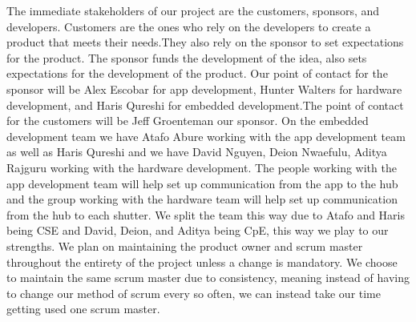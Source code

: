The immediate stakeholders of our project are the customers, sponsors, and developers. Customers are the ones who rely on the developers to create a product that meets their needs.They also rely on the sponsor to set expectations for the product. The sponsor funds the development of the idea, also sets expectations for the development of the product. Our point of contact for the sponsor will be Alex Escobar for app development, Hunter Walters for hardware development, and Haris Qureshi for embedded development.The point of contact for the customers will be Jeff Groenteman our sponsor. On the embedded development team we have Atafo Abure working with the app development team as well as Haris Qureshi and we have David Nguyen, Deion Nwaefulu, Aditya Rajguru working with the hardware development. The people working with the app development team will help set up communication from the app to the hub and the group working with the hardware team will help set up communication from the hub to each shutter. We split the team this way due to Atafo and Haris being CSE and David, Deion, and Aditya being CpE, this way we play to our strengths. We plan on maintaining the product owner and scrum master throughout the entirety of the project unless a change is mandatory. We choose to maintain the same scrum master due to consistency, meaning instead of having to change our method of scrum every so often, we can instead take our time getting used one scrum master.
